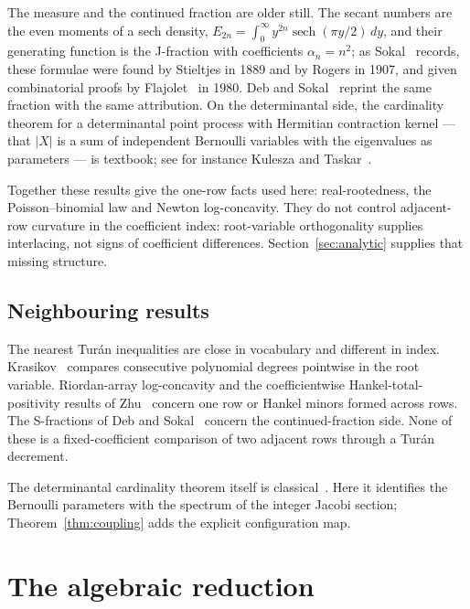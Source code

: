 \documentclass[11pt,a4paper]{article}
\theoremstyle{plain}
\theoremstyle{definition}
\theoremstyle{remark}
\begin{document}
The measure and the continued fraction are older still. The secant numbers are
the even moments of a sech density,
$E_{2n}=\int_0^\infty y^{2n}\operatorname{sech}(\pi y/2)\,dy$, and their
generating function is the J-fraction with coefficients $\alpha_n=n^2$; as
Sokal~\cite{sokal2020} records, these formulae were found by Stieltjes in 1889
and by Rogers in 1907, and given combinatorial proofs by
Flajolet~\cite{flajolet1980} in 1980. Deb and Sokal~\cite{debSokal2024} reprint
the same fraction with the same attribution. On the determinantal side, the
cardinality theorem for a determinantal point process with Hermitian
contraction kernel --- that $|X|$ is a sum of independent Bernoulli variables
with the eigenvalues as parameters --- is textbook; see for instance
Kulesza and Taskar~\cite{kuleszaTaskar2012}.

Together these results give the one-row facts used here: real-rootedness, the
Poisson--binomial law and Newton log-concavity. They do not control adjacent-row
curvature in the coefficient index: root-variable orthogonality supplies
interlacing, not signs of coefficient differences. Section~\ref{sec:analytic}
supplies that missing structure.

\subsection{Neighbouring results}\label{sec:priorart}

The nearest Tur\'an inequalities are close in vocabulary and different in
index. Krasikov~\cite{krasikov2011} compares consecutive polynomial degrees
pointwise in the root variable. Riordan-array log-concavity and the
coefficientwise Hankel-total-positivity results of Zhu~\cite{zhu2021,zhu2022,zhu2026}
concern one row or Hankel minors formed across rows. The S-fractions of Deb and
Sokal~\cite{debSokal2024} concern the continued-fraction side. None of these is
a fixed-coefficient comparison of two adjacent rows through a Tur\'an
decrement.

The determinantal cardinality theorem itself is classical~\cite{kuleszaTaskar2012}.
Here it identifies the Bernoulli parameters with the spectrum of the integer
Jacobi section; Theorem~\ref{thm:coupling} adds the explicit configuration map.

\section{The algebraic reduction}\label{sec:reduction}
\end{document}
